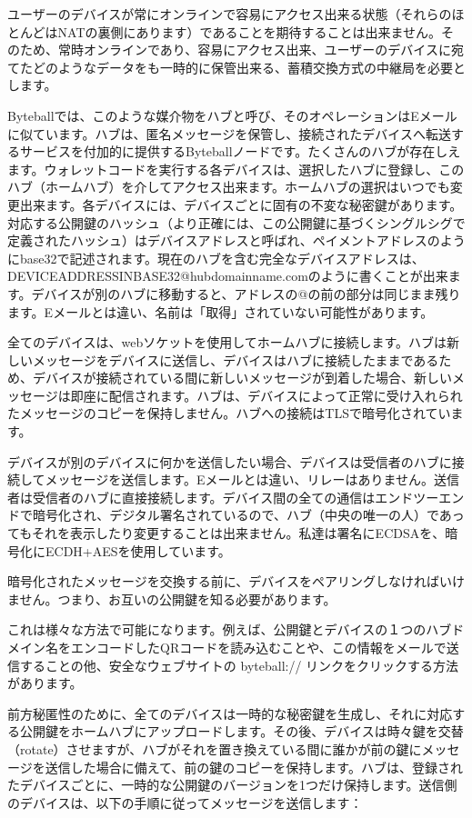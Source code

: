 \documentclass[a4paper, dvipdfmx]{jsarticle}
\begin{document}
ユーザーのデバイスが常にオンラインで容易にアクセス出来る状態（それらのほとんどはNATの裏側にあります）であることを期待することは出来ません。そのため、常時オンラインであり、容易にアクセス出来、ユーザーのデバイスに宛てたどのようなデータをも一時的に保管出来る、蓄積交換方式の中継局を必要とします。

Byteballでは、このような媒介物をハブと呼び、そのオペレーションはEメールに似ています。ハブは、匿名メッセージを保管し、接続されたデバイスへ転送するサービスを付加的に提供するByteballノードです。たくさんのハブが存在しえます。ウォレットコードを実行する各デバイスは、選択したハブに登録し、このハブ（ホームハブ）を介してアクセス出来ます。ホームハブの選択はいつでも変更出来ます。各デバイスには、デバイスごとに固有の不変な秘密鍵があります。対応する公開鍵のハッシュ（より正確には、この公開鍵に基づくシングルシグで定義されたハッシュ）はデバイスアドレスと呼ばれ、ペイメントアドレスのようにbase32で記述されます。現在のハブを含む完全なデバイスアドレスは、DEVICEADDRESSINBASE32@hubdomainname.comのように書くことが出来ます。デバイスが別のハブに移動すると、アドレスの@の前の部分は同じまま残ります。Eメールとは違い、名前は「取得」されていない可能性があります。

全てのデバイスは、webソケットを使用してホームハブに接続します。ハブは新しいメッセージをデバイスに送信し、デバイスはハブに接続したままであるため、デバイスが接続されている間に新しいメッセージが到着した場合、新しいメッセージは即座に配信されます。ハブは、デバイスによって正常に受け入れられたメッセージのコピーを保持しません。ハブへの接続はTLSで暗号化されています。

デバイスが別のデバイスに何かを送信したい場合、デバイスは受信者のハブに接続してメッセージを送信します。Eメールとは違い、リレーはありません。送信者は受信者のハブに直接接続します。デバイス間の全ての通信はエンドツーエンドで暗号化され、デジタル署名されているので、ハブ（中央の唯一の人）であってもそれを表示したり変更することは出来ません。私達は署名にECDSAを、暗号化にECDH+AESを使用しています。

暗号化されたメッセージを交換する前に、デバイスをペアリングしなければいけません。つまり、お互いの公開鍵を知る必要があります。

これは様々な方法で可能になります。例えば、公開鍵とデバイスの１つのハブドメイン名をエンコードしたQRコードを読み込むことや、この情報をメールで送信することの他、安全なウェブサイトの byteball:// リンクをクリックする方法があります。

前方秘匿性のために、全てのデバイスは一時的な秘密鍵を生成し、それに対応する公開鍵をホームハブにアップロードします。その後、デバイスは時々鍵を交替（rotate）させますが、ハブがそれを置き換えている間に誰かが前の鍵にメッセージを送信した場合に備えて、前の鍵のコピーを保持します。ハブは、登録されたデバイスごとに、一時的な公開鍵のバージョンを1つだけ保持します。送信側のデバイスは、以下の手順に従ってメッセージを送信します：
\end{document}
